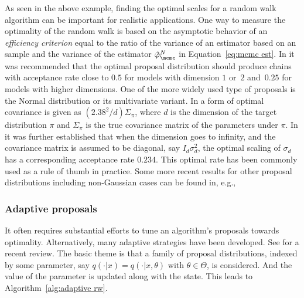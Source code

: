 As seen in the above example, finding the optimal scales for a random walk
algorithm can be important for realistic applications. One way to measure the
optimality of the random walk is based on the asymptotic behavior of an
\emph{efficiency criterion} equal to the ratio of the variance of an
estimator based on an \iid sample and the variance of the estimator
$\hat\varphi_{\mcmc}^N$ in Equation~\eqref{eq:mcmc est}. In
\cite{Roberts:1997dg} it was recommended that the optimal proposal
distribution should produce chains with acceptance rate close to $0.5$ for
models with dimension $1$ or~$2$ and~$0.25$ for models with higher
dimensions. One of the more widely used type of proposals is the Normal
distribution or its multivariate variant. In \cite{Gelman:1995vx} a form of
optimal covariance is given as $(2.38^2/d)\Sigma_{\pi}$, where $d$ is the
dimension of the target distribution $\pi$ and $\Sigma_{\pi}$ is the true
covariance matrix of the parameters under $\pi$. In \cite{Roberts:2001ta} it
was further established that when the dimension goes to infinity, and the
covariance matrix is assumed to be diagonal, say $I_d\sigma_d^2$, the optimal
scaling of $\sigma_d$ has a corresponding acceptance rate $0.234$. This
optimal rate has been commonly used as a rule of thumb in practice. Some more
recent results for other proposal distributions including non-Gaussian cases
can be found in, e.g., \cite{Chris:2009vx,Peter:2011vx}

\subsubsection{Adaptive proposals}
\label{ssub:Adaptive proposals}

It often requires substantial efforts to tune an algorithm's proposals towards
optimality. Alternatively, many adaptive strategies have been developed. See
\cite{Andrieu:2008kh} for a recent review. The basic theme is that a family of
proposal distributions, indexed by some parameter, say $q(\cdot|x) =
q(\cdot|x, \theta)$ with $\theta\in\Theta$, is considered. And the value of
the parameter is updated along with the state. This leads to
Algorithm~\ref{alg:adaptive rw}.



